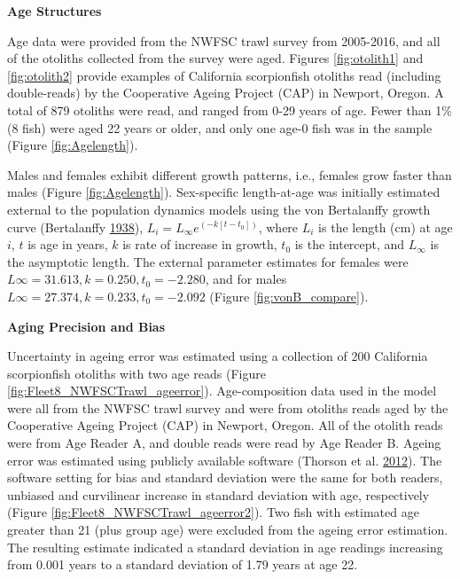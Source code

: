 \documentclass[12pt,]{article}
\begin{document}
\vspace{.5cm}

\textbf{Age Structures}

Age data were provided from the NWFSC trawl survey from 2005-2016, and
all of the otoliths collected from the survey were aged. Figures
\ref{fig:otolith1} and \ref{fig:otolith2} provide examples of California
scorpionfish otoliths read (including double-reads) by the Cooperative
Ageing Project (CAP) in Newport, Oregon. A total of 879 otoliths were
read, and ranged from 0-29 years of age. Fewer than 1\% (8 fish) were
aged 22 years or older, and only one age-0 fish was in the sample
(Figure \ref{fig:Agelength}).

Males and females exhibit different growth patterns, i.e., females grow
faster than males (Figure \ref{fig:Agelength}). Sex-specific
length-at-age was initially estimated external to the population
dynamics models using the von Bertalanffy growth curve (Bertalanffy
\protect\hyperlink{ref-vonB1938}{1938}),
\(L_i = L_{\infty}e^{(-k[t-t_0])}\), where \(L_i\) is the length (cm) at
age \(i\), \(t\) is age in years, \(k\) is rate of increase in growth,
\(t_0\) is the intercept, and \(L_{\infty}\) is the asymptotic length.
The external parameter estimates for females were
\(L{\infty}=31.613, k = 0.250, t_0 = -2.280\), and for males
\(L{\infty}=27.374, k = 0.233, t_0 = -2.092\) (Figure
\ref{fig:vonB_compare}).

\vspace{.5cm}

\textbf{Aging Precision and Bias}

Uncertainty in ageing error was estimated using a collection of 200
California scorpionfish otoliths with two age reads (Figure
\ref{fig:Fleet8_NWFSCTrawl_ageerror}). Age-composition data used in the
model were all from the NWFSC trawl survey and were from otoliths reads
aged by the Cooperative Ageing Project (CAP) in Newport, Oregon. All of
the otolith reads were from Age Reader A, and double reads were read by
Age Reader B. Ageing error was estimated using publicly available
software (Thorson et al. \protect\hyperlink{ref-Thorson2012}{2012}). The
software setting for bias and standard deviation were the same for both
readers, unbiased and curvilinear increase in standard deviation with
age, respectively (Figure \ref{fig:Fleet8_NWFSCTrawl_ageerror2}). Two
fish with estimated age greater than 21 (plus group age) were excluded
from the ageing error estimation. The resulting estimate indicated a
standard deviation in age readings increasing from 0.001 years to a
standard deviation of 1.79 years at age 22.
\end{document}
